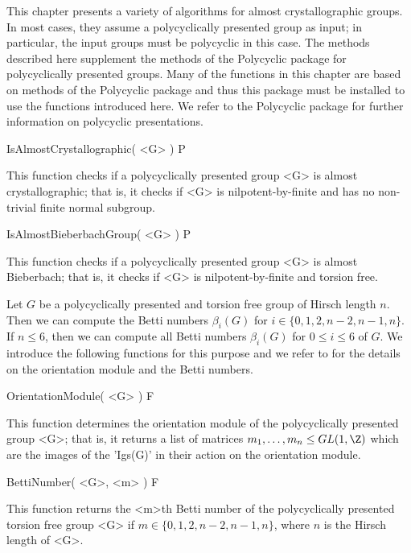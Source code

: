 
This chapter presents a variety of algorithms for almost crystallographic
groups. In most cases, they assume a polycyclically presented group as 
input; in particular, the input groups must be polycyclic in this case.
The methods described here supplement the methods of the {\sf Polycyclic} 
package for polycyclically presented groups. Many of the functions in this 
chapter are based on methods of the {\sf Polycyclic} package and thus this 
package must be installed to use the functions introduced here. We refer to
the {\sf Polycyclic} package for further information on polycyclic 
presentations.


\> IsAlmostCrystallographic( <G> ) P

This function checks if a polycyclically presented group <G> is almost
crystallographic; that is, it checks if <G> is nilpotent-by-finite and
has no non-trivial finite normal subgroup.  

\> IsAlmostBieberbachGroup( <G> ) P

This function checks if a polycyclically presented group <G> is almost
Bieberbach; that is, it checks if <G> is nilpotent-by-finite and torsion
free.


Let $G$ be a polycyclically presented and torsion free group of Hirsch 
length $n$. Then we can compute the Betti numbers $\beta_i(G)$ for $i \in 
\{0, 1, 2, n-2, n-1, n\}$. If $n \leq 6$, then we can compute all Betti
numbers $\beta_i(G)$ for $0 \leq i \leq 6$ of $G$. We introduce the following
functions for this purpose and we refer to \cite{BRO} for the details on 
the orientation module and the Betti numbers.

\> OrientationModule( <G> ) F

This function determines the orientation module of the polycyclically
presented group <G>; that is, it returns a list of matrices $m_1, \ldots,
m_n \leq GL( 1, \Z )$ which are the images of the 'Igs(G)' in their action
on the orientation module.  

\> BettiNumber( <G>, <m> ) F

This function returns the <m>th Betti number of the polycyclically presented
torsion free group <G> if $m \in \{0, 1, 2, n-2, n-1, n\}$, where $n$ is the 
Hirsch length of <G>. 

